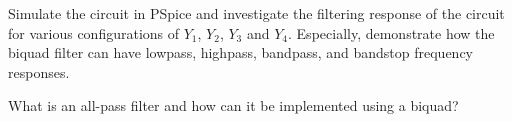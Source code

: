 \documentclass[11pt]{article}
\begin{document}
\begin{question}
\begin{subquestion}{Simulate the circuit in PSpice and investigate the filtering response of the circuit for various configurations of $Y_1$, $Y_2$, $Y_3$ and $Y_4$. Especially, demonstrate how the biquad filter can have lowpass, highpass, bandpass, and bandstop frequency responses.}
\answer{}
\end{subquestion}
\begin{subquestion}{What is an all-pass filter and how can it be implemented using a biquad?} 
\answer{}
\end{subquestion}

\end{question}



\begin{question}


\end{question}

\end{document}
